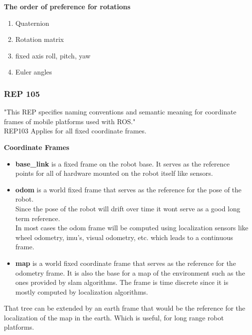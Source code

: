 	\textbf{The order of preference for rotations}
	\begin{enumerate}
		\item Quaternion
		\item Rotation matrix
		\item fixed axis roll, pitch, yaw
		\item Euler angles
	\end{enumerate}
	\cite{REP103}
	
\subsubsection{REP 105}
	"This REP specifies naming conventions and semantic meaning for coordinate frames of mobile platforms used with ROS."\cite{REP105}\\
	
	REP103 Applies for all fixed coordinate frames.
	
	\textbf{Coordinate Frames}
	\begin{itemize}
		\item \textbf{base\_link} is a fixed frame on the robot base. It serves as the reference points for all of hardware mounted on the robot itself like sensors.
		\item \textbf{odom} is a world fixed frame that serves as the reference for the pose of the robot.\\ Since the pose of the robot will drift over time it wont serve as a good long term reference.\\In most cases the odom frame will be computed using localization sensors like wheel odometry, imu's, visual odometry, etc. which leads to a continuous frame.
		\item \textbf{map} is a world fixed coordinate frame that serves as the reference for the odometry frame. It is also the base for a map of the environment such as the ones provided by slam algorithms. The frame is time discrete since it is mostly computed by localization algorithms.
	\end{itemize}
	
	That tree can be extended by an earth frame that would be the reference for the localization of the map in the earth. Which is useful, for long range robot platforms.\cite{REP105}
	
	
	
